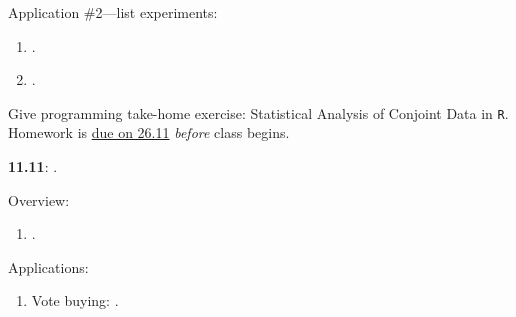 \documentclass[letterpaper]{article}
\renewenvironment{itemize}{
  \begin{list}{}{
    \setlength{\leftmargin}{1.5em}
  }
}{
  \end{list}
}
\begin{document}
\begin{enumerate}
\begin{itemize}
\begin{enumerate}
        

         \end{enumerate}

        \item[$\diamond$] Application \#2---list experiments:

          \begin{enumerate}

              \item[$\bullet$] \href{https://doi.org/10.1093/pan/mpr048}{}.

              \item[$\bullet$] \href{https://link.springer.com/10.1057/s41269-020-00174-4}{}.

          \end{enumerate}

       \item[{\color{red}$\diamond$}] {\color{red}Give programming take-home exercise: Statistical Analysis of Conjoint Data in \texttt{R}. Homework is \underline{due on 26.11} \emph{before} class begins}.

      \end{itemize}


  \item {\bf 11.11}:  {\color{ForestGreen}{\bf Lab Experiments}}.

        \begin{itemize} 

        \item[$\diamond$] Overview:

        \begin{enumerate}
          \item[$\bullet$] \href{https://doi.org/10.1017/gov.2018.14}{}.

          
        \end{enumerate}

       \item[$\diamond$] Applications:

           \begin{enumerate}

           \item[$\bullet$] Vote buying: \href{https://doi.org/10.1016/j.electstud.2022.102497}{}.


\end{enumerate}
\end{itemize}
\end{enumerate}
\end{document}
